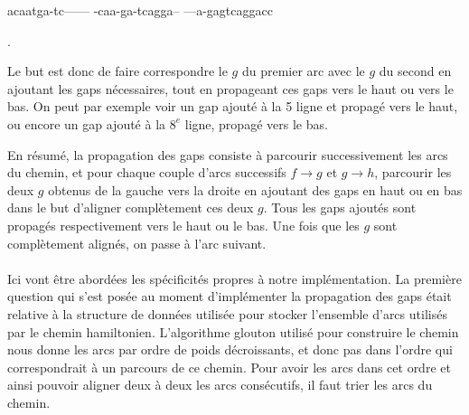 \documentclass{article}
\begin{document}
\begin{boxedverbatim}
acaatga-tc------
-caa-ga-tcagga--
---a-gagtcaggacc
\end{boxedverbatim}.

Le but est donc de faire correspondre le $g$ du premier arc avec le $g$ du second en ajoutant les gaps nécessaires, tout en propageant ces gaps vers le haut ou vers le bas. On peut par exemple voir un gap ajouté à la 5 ligne et propagé vers le haut, ou encore un gap ajouté à la $8^e$ ligne, propagé vers le bas.

En résumé, la propagation des gaps consiste à parcourir successivement les arcs du chemin, et pour chaque couple d'arcs successifs
$f \to g$ et $g \to h$, parcourir les deux $g$ obtenus de la gauche vers la droite en ajoutant des gaps en haut ou en bas dans le but d'aligner complètement ces deux $g$. Tous les gaps ajoutés sont propagés respectivement vers le haut ou le bas. Une fois que les $g$ sont complètement alignés, on passe à l'arc suivant.
\\~\\


Ici vont être abordées les spécificités propres à notre implémentation. La première question qui s'est posée au moment d'implémenter la propagation des gaps était relative à la structure de données utilisée pour stocker l'ensemble d'arcs utilisés par le chemin hamiltonien. 
L'algorithme glouton utilisé pour construire le chemin nous donne les arcs par ordre de poids décroissants, et donc pas dans l'ordre qui correspondrait à un parcours de ce chemin. Pour avoir les arcs dans cet ordre et ainsi pouvoir aligner deux à deux les arcs consécutifs, il faut trier les arcs du chemin.
\end{document}
